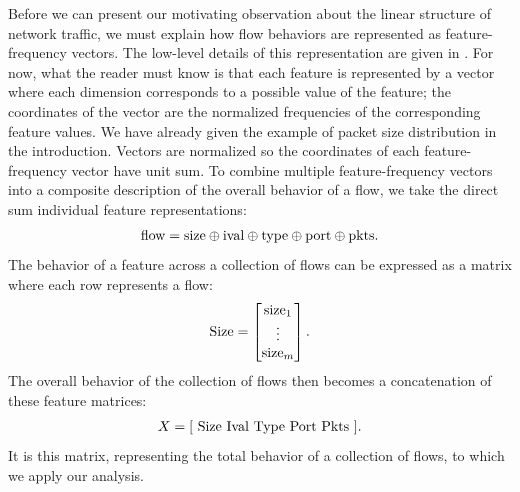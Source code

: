 \documentclass[conference]{IEEEtran}
\begin{document}

Before we can present our motivating observation about the linear structure of network traffic, we must explain how flow behaviors are represented as feature-frequency vectors. The low-level details of this representation are given in .
For now, what the reader must know is that each feature is represented by a vector where each dimension corresponds to a possible value of the feature;
the coordinates of the vector are the normalized frequencies of the corresponding feature values.
We have already given the example of packet size distribution in the introduction.
Vectors are normalized so the coordinates of each feature-frequency vector have unit sum.
To combine multiple feature-frequency vectors into a composite description of the overall behavior of a flow, we take the direct sum individual feature representations:\directsumnote
\begin{align}\eqn{flow}
  \text{flow} =
  \text{size} \directsum
  \text{ival} \directsum
  \text{type} \directsum
  \text{port} \directsum
  \text{pkts}.
\end{align}
The behavior of a feature across a collection of flows can be expressed as a matrix where each row represents a flow:
\begin{align}\eqn{Size}
  \text{Size} = \begin{bmatrix}
    \text{size}_1 \\
    \vdots \\
    \text{size}_m
  \end{bmatrix}.
\end{align}
The overall behavior of the collection of flows then becomes a concatenation of these feature matrices:
\begin{align}\eqn{X}
  X = \bracket{ ~
    \text{Size} ~
    \text{Ival} ~
    \text{Type} ~
    \text{Port} ~
    \text{Pkts} ~
  }.
\end{align}
It is this matrix, representing the total behavior of a collection of flows, to which we apply our analysis.


\end{document}
